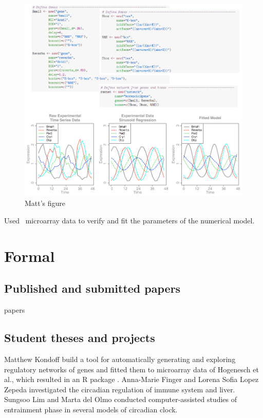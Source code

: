 \documentclass[a4paper]{article}
\begin{document}
\begin{figure}
\begin{center}
\includegraphics[width=\linewidth]{figures/matt/matt.pdf}
\end{center}
\caption{
Matt's figure
\label{fig::matt}
}
\end{figure}


Used~\cite{zhang2014circadian} microarray data to verify and fit the
parameters of the numerical model.


\section{Formal}

\subsection{Published and submitted papers}
papers
\cite{bordyugov2015tuning,schmal2015theoretical,kondoff2015modeling,schmal2017moran,wagner2017plant,myung2017choroid,schmal2017measuring}

\subsection{Student theses and projects}
Matthew Kondoff build a tool for automatically generating and
exploring regulatory networks of genes and fitted them to microarray
data of Hogenesch et al., which resulted in an R package
\cite{kondoff2015modeling}. Anna-Marie Finger and Lorena Sofia Lopez
Zepeda investigated the circadian regulation of immune system and
liver.  Sungsoo Lim and Marta del Olmo conducted computer-assisted
studies of entrainment phase in several models of circadian clock.
\end{document}
